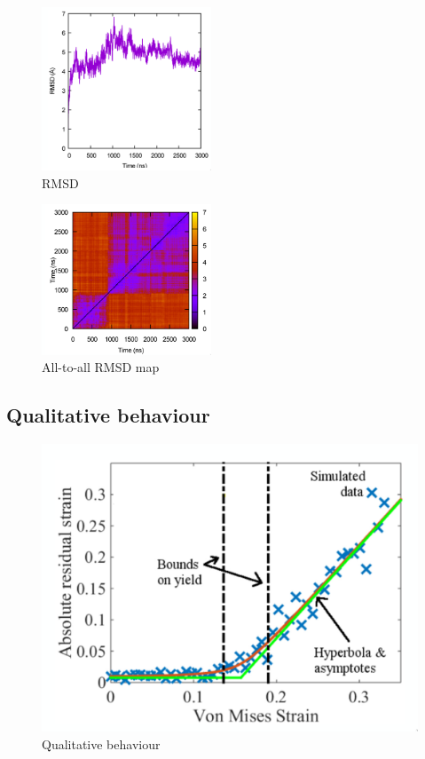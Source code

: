 \begin{multicols}{2}

	\begin{figure}[H]
		\includegraphics[width = 0.45\textwidth]{rmsd}
		\caption{RMSD}
		\label{fig:rmsd}
	\end{figure}

	\columnbreak

	\begin{figure}[H]
		\includegraphics[width = 0.45\textwidth]{all-to-all-rmsd}
		\caption{All-to-all RMSD map}
		\label{fig:all-to-all-rmsd}
	\end{figure}

\end{multicols}

	\subsection{Qualitative behaviour}

	\begin{figure}[H]
		\includegraphics[width = \textwidth]{qualitative-behaviour}
		\caption{Qualitative behaviour}
		\label{qualitative-behaviour}
	\end{figure}

